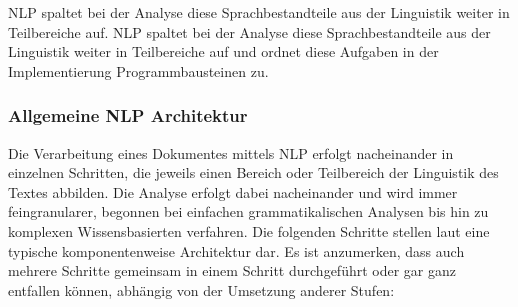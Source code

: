 \documentclass[12pt]{paper}
\begin{document}
NLP spaltet bei der Analyse diese Sprachbestandteile aus der Linguistik weiter in Teilbereiche auf.
NLP spaltet bei der Analyse diese Sprachbestandteile aus der Linguistik weiter in Teilbereiche auf und ordnet diese Aufgaben in der Implementierung Programmbausteinen zu.

\subsubsection{Allgemeine NLP Architektur}
Die Verarbeitung eines Dokumentes mittels NLP erfolgt nacheinander in einzelnen Schritten, die jeweils einen Bereich oder Teilbereich der Linguistik des Textes abbilden. Die Analyse erfolgt dabei nacheinander und wird immer feingranularer, begonnen bei einfachen grammatikalischen Analysen bis hin zu komplexen Wissensbasierten verfahren. Die folgenden Schritte stellen laut \cite{cop04} eine typische komponentenweise Architektur dar. Es ist anzumerken, dass auch mehrere Schritte gemeinsam in einem Schritt durchgeführt oder gar ganz entfallen können, abhängig von der Umsetzung anderer Stufen:
\end{document}
